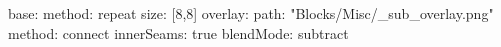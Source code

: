 base:
  method: repeat
  size: [8,8]
overlay:
  path: "Blocks/Misc/_sub_overlay.png"
  method: connect
  innerSeams: true
  blendMode: subtract
